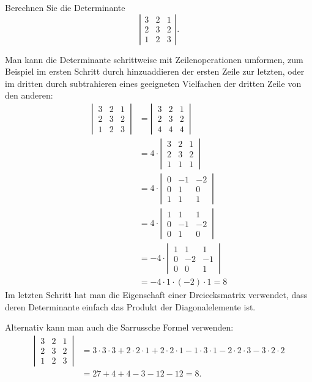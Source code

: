 Berechnen Sie die Determinante
\[
\left|\begin{matrix}
3&2&1\\
2&3&2\\
1&2&3
\end{matrix}\right|
.
\]

\begin{loesung}
Man kann die Determinante schrittweise mit Zeilenoperationen umformen,
zum Beispiel im ersten Schritt durch hinzuaddieren der ersten Zeile
zur letzten, oder im dritten durch subtrahieren eines geeigneten
Vielfachen der dritten Zeile von den anderen:
\begin{align*}
\left|\,\begin{matrix}
3&2&1\\
2&3&2\\
1&2&3
\end{matrix}\,\right|
&=
\left|\,\begin{matrix}
3&2&1\\
2&3&2\\
4&4&4
\end{matrix}\,\right|
\\&=
4\cdot \left|\,\begin{matrix}
3&2&1\\
2&3&2\\
1&1&1
\end{matrix}\,\right|
\\&=
4\cdot \left|\,\begin{matrix}
0&-1&-2\\
0& 1& 0\\
1& 1& 1
\end{matrix}\,\right|
\\&=
4\cdot \left|\,\begin{matrix}
1& 1& 1\\
0&-1&-2\\
0& 1& 0
\end{matrix}\,\right|
\\&=
-4\cdot \left|\,\begin{matrix}
1& 1& 1\\
0&-2&-1\\
0& 0& 1
\end{matrix}\,\right|
\\&=
-4\cdot 1\cdot (-2)\cdot 1=8
\end{align*}
Im letzten Schritt hat man die Eigenschaft einer Dreiecksmatrix verwendet,
dass deren Determinante einfach das Produkt der Diagonalelemente ist.

Alternativ kann man auch die Sarrussche Formel verwenden:
\begin{align*}
\left|\,\begin{matrix}
3&2&1\\
2&3&2\\
1&2&3
\end{matrix}\,\right|
&=
3\cdot 3\cdot 3+2\cdot 2\cdot 1 + 2\cdot 2\cdot 1
-1\cdot 3\cdot 1-2\cdot 2\cdot 3-3\cdot 2\cdot 2
\\
&=27+4+4-3-12-12=8.
\end{align*}


\end{loesung}

